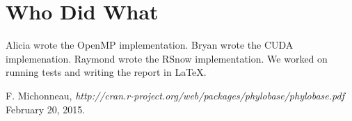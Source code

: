 \documentclass[11pt,letterpaper]{article}
\begin{document}
\section{Who Did What} \label{App:AppendixB}

Alicia wrote the OpenMP implementation. Bryan wrote the CUDA implemenation. Raymond wrote the RSnow implementation. We worked on running tests and writing the report in  \LaTeX.

\newpage

\begin{thebibliography}{1}

   F. Michonneau, {\em http://cran.r-project.org/web/packages/phylobase/phylobase.pdf}  February 20, 2015.



\end{thebibliography}
\end{document}
